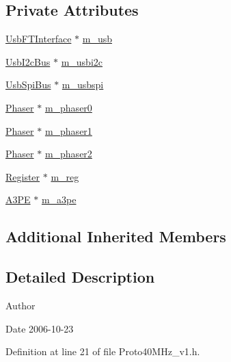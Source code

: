 \subsection*{Private Attributes}
\begin{DoxyCompactItemize}
\item 
\hyperlink{classUsbFTInterface}{Usb\+F\+T\+Interface} $\ast$ \hyperlink{classProto40MHz__v1_a954047995f615e6c6b60d178263cc09c}{m\+\_\+usb}
\item 
\hyperlink{classUsbI2cBus}{Usb\+I2c\+Bus} $\ast$ \hyperlink{classProto40MHz__v1_ae4f9dc7b1549d4ef43e1e6b35f28d41d}{m\+\_\+usbi2c}
\item 
\hyperlink{classUsbSpiBus}{Usb\+Spi\+Bus} $\ast$ \hyperlink{classProto40MHz__v1_a3539294876a0bd775da282777d2091ca}{m\+\_\+usbspi}
\item 
\hyperlink{classPhaser}{Phaser} $\ast$ \hyperlink{classProto40MHz__v1_a4464d318fb4a546bd855b46f403deb2a}{m\+\_\+phaser0}
\item 
\hyperlink{classPhaser}{Phaser} $\ast$ \hyperlink{classProto40MHz__v1_abb2d522883488411af268ca1435d8189}{m\+\_\+phaser1}
\item 
\hyperlink{classPhaser}{Phaser} $\ast$ \hyperlink{classProto40MHz__v1_a201c755bc33cf5b6c14c6833e913755b}{m\+\_\+phaser2}
\item 
\hyperlink{classRegister}{Register} $\ast$ \hyperlink{classProto40MHz__v1_a8533a6455eebc9add8e394ac2cf3af9f}{m\+\_\+reg}
\item 
\hyperlink{classA3PE}{A3\+PE} $\ast$ \hyperlink{classProto40MHz__v1_a504389d91640776389db46797ca53909}{m\+\_\+a3pe}
\end{DoxyCompactItemize}
\subsection*{Additional Inherited Members}


\subsection{Detailed Description}
\begin{DoxyAuthor}{Author}

\end{DoxyAuthor}
\begin{DoxyDate}{Date}
2006-\/10-\/23 
\end{DoxyDate}


Definition at line 21 of file Proto40\+M\+Hz\+\_\+v1.\+h.



